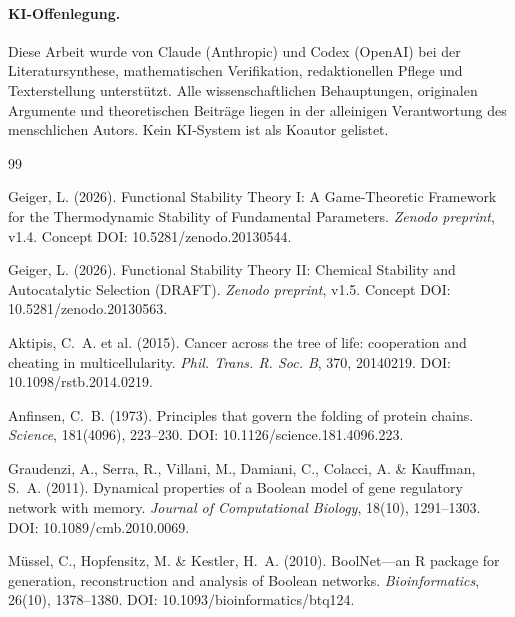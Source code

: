 \documentclass[12pt,a4paper]{article}
\theoremstyle{remark}
\begin{document}
\begingroup
\small
\paragraph*{KI-Offenlegung.} Diese Arbeit wurde von Claude (Anthropic) und Codex (OpenAI) bei der Literatursynthese, mathematischen Verifikation, redaktionellen Pflege und Texterstellung unterstützt. Alle wissenschaftlichen Behauptungen, originalen Argumente und theoretischen Beiträge liegen in der alleinigen Verantwortung des menschlichen Autors. Kein KI-System ist als Koautor gelistet.
\endgroup



\begin{thebibliography}{99}
\small
\setlength{\itemsep}{0pt}
\setlength{\parskip}{0pt}
\setlength{\parsep}{0pt}

Geiger, L. (2026).
\newblock Functional Stability Theory I: A Game-Theoretic Framework for the Thermodynamic Stability of Fundamental Parameters.
\newblock \textit{Zenodo preprint}, v1.4.
\newblock Concept DOI: 10.5281/zenodo.20130544.

Geiger, L. (2026).
\newblock Functional Stability Theory II: Chemical Stability and Autocatalytic Selection (DRAFT).
\newblock \textit{Zenodo preprint}, v1.5.
\newblock Concept DOI: 10.5281/zenodo.20130563.

Aktipis, C.~A. et al. (2015).
\newblock Cancer across the tree of life: cooperation and cheating in multicellularity.
\newblock \textit{Phil. Trans. R. Soc. B}, 370, 20140219.
\newblock DOI: 10.1098/rstb.2014.0219.

Anfinsen, C.~B. (1973).
\newblock Principles that govern the folding of protein chains.
\newblock \textit{Science}, 181(4096), 223--230.
\newblock DOI: 10.1126/science.181.4096.223.

Graudenzi, A., Serra, R., Villani, M., Damiani, C., Colacci, A. \& Kauffman, S.~A. (2011).
\newblock Dynamical properties of a Boolean model of gene regulatory network with memory.
\newblock \textit{Journal of Computational Biology}, 18(10), 1291--1303.
\newblock DOI: 10.1089/cmb.2010.0069.

Müssel, C., Hopfensitz, M. \& Kestler, H.~A. (2010).
\newblock BoolNet---an R package for generation, reconstruction and analysis of Boolean networks.
\newblock \textit{Bioinformatics}, 26(10), 1378--1380.
\newblock DOI: 10.1093/bioinformatics/btq124.


\end{thebibliography}
\end{document}
